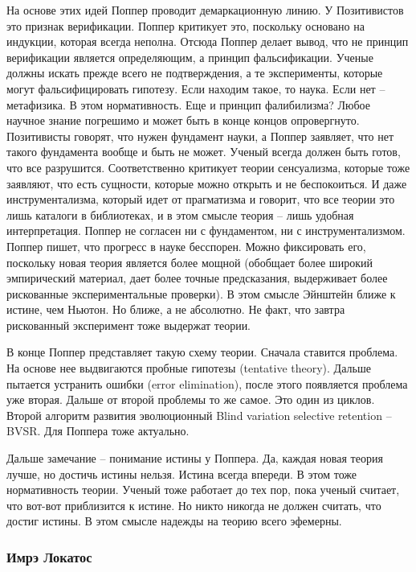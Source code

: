 \documentclass[a4paper, 12pt]{article}
\begin{document}
На основе этих идей Поппер проводит демаркационную линию. У Позитивистов 
это признак верификации. Поппер критикует это, поскольку основано на 
индукции, которая всегда неполна. Отсюда Поппер делает вывод, что не 
принцип верификации является определяющим, а принцип фальсификации. 
Ученые должны искать прежде всего не подтверждения, а те эксперименты, 
которые могут фальсифицировать гипотезу. Если находим такое, то наука. 
Если нет -- метафизика. В этом нормативность. Еще и принцип фалибилизма? 
Любое научное знание погрешимо и может быть в конце концов опровергнуто. 
Позитивисты говорят, что нужен фундамент науки, а Поппер заявляет, что 
нет такого фундамента вообще и быть не может. Ученый всегда должен быть 
готов, что все разрушится. Соответственно критикует теории сенсуализма, 
которые тоже заявляют, что есть сущности, которые можно открыть и не 
беспокоиться. И даже инструментализма, который идет от прагматизма 
и говорит, что все теории это лишь каталоги в библиотеках, и в этом 
смысле теория -- лишь удобная интерпретация. Поппер не согласен ни 
с фундаментом, ни с инструментализмом. Поппер пишет, что прогресс 
в науке бесспорен. Можно фиксировать его, поскольку новая теория 
является более мощной (обобщает более широкий эмпирический материал, 
дает более точные предсказания, выдерживает более рискованные 
экспериментальные проверки). В этом смысле Эйнштейн ближе к истине, чем 
Ньютон. Но ближе, а не абсолютно. Не факт, что завтра рискованный 
эксперимент тоже выдержат теории.

В конце Поппер представляет такую схему теории.
Сначала ставится проблема. На основе нее выдвигаются пробные гипотезы 
(tentative theory). Дальше пытается устранить ошибки (error 
elimination), после этого появляется проблема уже вторая. Дальше от 
второй проблемы то же самое. Это один из циклов. Второй алгоритм 
развития эволюционный Blind variation selective retention -- BVSR. Для 
Поппера тоже актуально.

Дальше замечание -- понимание истины у Поппера. Да, каждая новая теория 
лучше, но достичь истины нельзя. Истина всегда впереди. В этом тоже 
нормативность теории. Ученый тоже работает до тех пор, пока ученый 
считает, что вот-вот приблизится к истине. Но никто никогда не должен 
считать, что достиг истины. В этом смысле надежды на теорию всего 
эфемерны.

\subsubsection{Имрэ Локатос}
\end{document}
